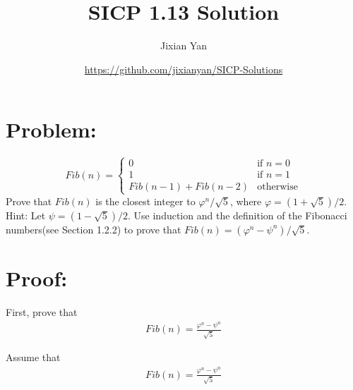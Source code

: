 \documentclass{article}
\begin{document}
\title{SICP 1.13 Solution}
\author{Jixian Yan}
\date{\url{https://github.com/jixianyan/SICP-Solutions}}
\maketitle

\section*{Problem:}

    \[
        Fib(n) = \left\{ 
                 \begin {array}{ll}
                 0 & \textrm{if $n = 0$} \\
                 1 & \textrm{if $n = 1$} \\
                 Fib(n - 1) + Fib(n - 2) & \textrm{otherwise}
                 \end{array}
                 \right.
    \]
    Prove that $Fib(n)$ is the closest integer to $\varphi^{n} / \sqrt{5}$, where 
    $\varphi = (1 + \sqrt{5}) / 2$. Hint: Let $\psi = (1 - \sqrt{5}) / 2$.
    Use induction and the definition of the Fibonacci numbers(see Section 1.2.2)
	to prove that $Fib(n) = (\varphi^{n} - \psi^{n})/\sqrt{5}$.

\section*{Proof:}


    First, prove that 
    \begin{eqnarray}
        Fib(n) = \frac{\varphi^{n} - \psi^{n}}{\sqrt{5}}
    \end{eqnarray}


	\noindent
	Assume that
	\begin{eqnarray}
        Fib(n) = \frac{\varphi^{n} - \psi^{n}}{\sqrt{5}}
    \end{eqnarray}
\end{document}
